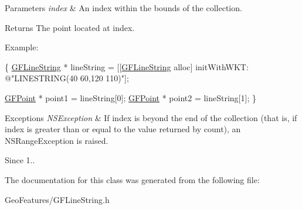 \begin{DoxyParams}{Parameters}
{\em index} & An index within the bounds of the collection.\\
\hline
\end{DoxyParams}
\begin{DoxyReturn}{Returns}
The point located at index.
\end{DoxyReturn}
Example\+:


\begin{DoxyCode}
\{
   \hyperlink{interface_g_f_line_string}{GFLineString} * lineString = [[\hyperlink{interface_g_f_line_string}{GFLineString} alloc] initWithWKT: \textcolor{stringliteral}{@"LINESTRING(40
       60,120 110)"}];

   \hyperlink{interface_g_f_point}{GFPoint} * point1 = lineString[0];
   \hyperlink{interface_g_f_point}{GFPoint} * point2 = lineString[1];
\}
\end{DoxyCode}



\begin{DoxyExceptions}{Exceptions}
{\em N\+S\+Exception} & If index is beyond the end of the collection (that is, if index is greater than or equal to the value returned by count), an N\+S\+Range\+Exception is raised.\\
\hline
\end{DoxyExceptions}
\begin{DoxySince}{Since}
1.. 
\end{DoxySince}


The documentation for this class was generated from the following file\+:\begin{DoxyCompactItemize}
\item 
Geo\+Features/G\+F\+Line\+String.\+h\end{DoxyCompactItemize}
